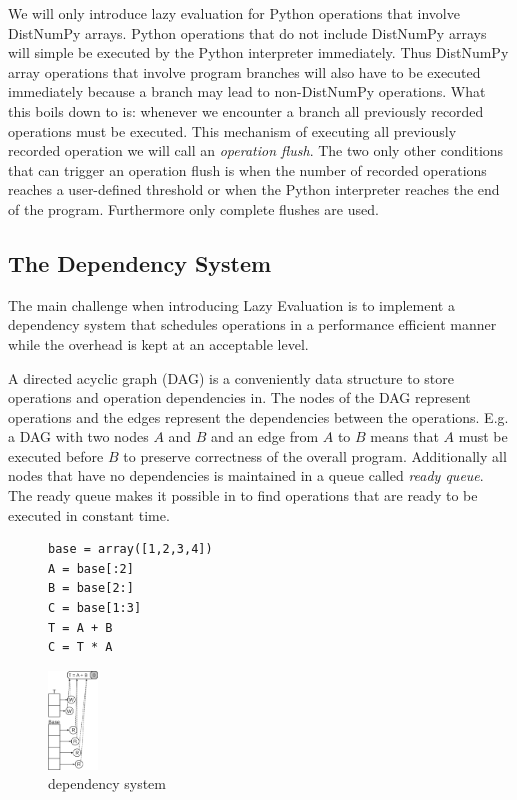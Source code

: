 \documentclass[preprint]{../PGAS10/sigplanconf}
\begin{document}
We will only introduce lazy evaluation for Python operations that involve DistNumPy arrays. Python operations that do not include DistNumPy arrays will simple be executed by the Python interpreter immediately. Thus DistNumPy array operations that involve program branches will also have to be executed immediately because a branch may lead to non-DistNumPy operations. What this boils down to is: whenever we encounter a branch all previously recorded operations must be executed. This mechanism of executing all previously recorded operation we will call an \emph{operation flush}. The two only other conditions that can trigger an operation flush is when the number of recorded operations reaches a user-defined threshold or when the Python interpreter reaches the end of the program. Furthermore only complete flushes are used.


\subsection{The Dependency System}
The main challenge when introducing Lazy Evaluation is to implement a dependency system that schedules operations in a performance efficient manner while the overhead is kept at an acceptable level.

A directed acyclic graph (DAG) is a conveniently data structure to store operations and operation dependencies in. The nodes of the DAG represent operations and the edges represent the dependencies between the operations. E.g. a DAG with two nodes $A$ and $B$ and an edge from $A$ to $B$ means that $A$ must be executed before $B$ to preserve correctness of the overall program. Additionally all nodes that have no dependencies is maintained in a queue called \emph{ready queue}. The ready queue makes it possible in to find operations that are ready to be executed in constant time.

\begin{figure}
\begin{lstlisting}
base = array([1,2,3,4])
A = base[:2]
B = base[2:]
C = base[1:3]
T = A + B
C = T * A
\end{lstlisting}
 \caption{}
 \label{lst:code_eg}
\end{figure}



\begin{figure}
 \centering
 \includegraphics[width=50px]{gfx/dependency_system}
 \caption{dependency system}
 \label{fig:dependency_system}
\end{figure}
\end{document}
